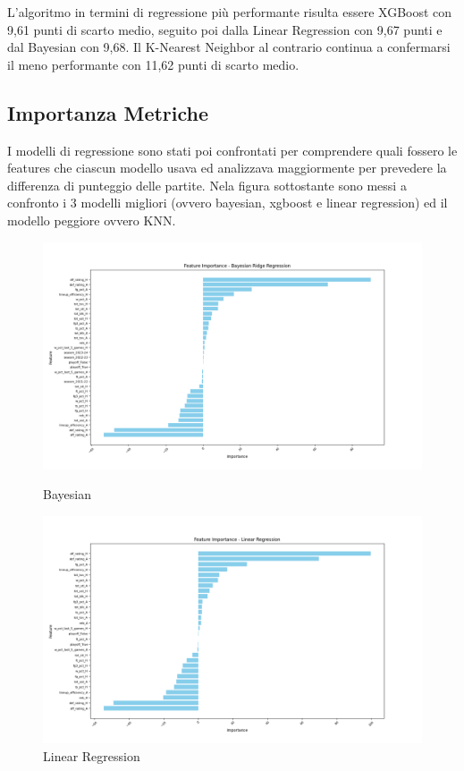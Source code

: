 \documentclass[a4paper]{article}
\numberwithin{equation}{section}
\begin{document}
L'algoritmo in termini di regressione più performante risulta essere XGBoost con 9,61 punti di scarto medio, seguito poi dalla Linear Regression con 9,67 punti e dal Bayesian con 9,68.
Il K-Nearest Neighbor al contrario continua a confermarsi il meno performante con 11,62 punti di scarto medio.

\subsection{Importanza Metriche}
I modelli di regressione sono stati poi confrontati per comprendere quali fossero le features che ciascun modello usava ed analizzava maggiormente per prevedere la differenza di punteggio delle partite. Nela figura sottostante sono messi a confronto i 3 modelli migliori (ovvero bayesian, xgboost e linear regression) ed il modello peggiore ovvero KNN.

\begin{figure}[H]
    \centering
    \begin{minipage}[b]{0.45\linewidth}
        \centering
        \includegraphics[width=\linewidth]{img/bayesian.png}
        \caption{Bayesian}
        \label{fig:first_label}
    \end{minipage}
    \hspace{0.05\linewidth}
    \begin{minipage}[b]{0.45\linewidth}
        \centering
        \includegraphics[width=\linewidth]{img/linear_regression.png}
        \caption{Linear Regression}
        \label{fig:second_label}
    \end{minipage}
\end{figure}
\end{document}
